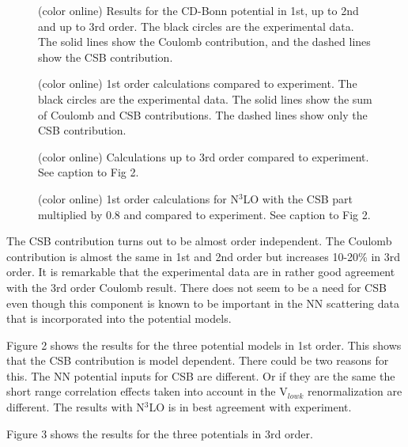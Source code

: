 \documentclass[twocolumn,aps,tightenlines,floatfix,showpacs]{revtex4}
\begin{document}
\begin{figure}
\caption{(color online) Results for the CD-Bonn potential
in 1st, up to 2nd and up to 3rd order.
The black circles
are the experimental data. The solid lines show the Coulomb
contribution, and the dashed lines show the CSB contribution.}
\end{figure}
\begin{figure}
\caption{(color online) 1st order calculations compared to
experiment. The black circles
are the experimental data. The solid lines show the sum of Coulomb and
CSB
contributions. The dashed lines show only the CSB contribution.}
\end{figure}
\begin{figure}
\caption{(color online) Calculations up to 3rd order compared to
experiment. See caption to Fig 2.}
\end{figure}
\begin{figure}
\caption{(color online) 1st order calculations for N$^3$LO
with the CSB part multiplied by 0.8 and compared to
experiment. See caption to Fig 2.}
\end{figure}



The CSB contribution turns out to be
almost order independent.
The Coulomb contribution is almost the same in 1st and 2nd order
but increases 10-20\% in 3rd order. It is remarkable that the
experimental data are in rather good agreement with the 3rd order
Coulomb result. There does not seem to be a need for CSB
even though this component is
known to be important in the NN scattering data that is
incorporated into the potential models.

Figure 2 shows the results for the three potential models in 1st order.
This shows that the CSB contribution is model dependent.
There could be two reasons for this. The NN potential
inputs for CSB are different.
Or if they are the same the short range correlation effects
taken into account in the V$_{lowk}$ renormalization are
different. The results with N$^3$LO is in best agreement with experiment.

Figure 3 shows the results for the three potentials in 3rd order.
\end{document}
